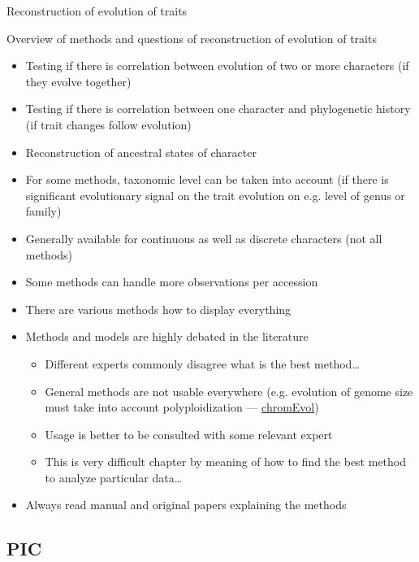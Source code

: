 \documentclass[compress, ucs, xelatex, 11pt, xcolor=svgnames, aspectratio=169,
	hyperref={
		bookmarks=true,
		unicode=true,
		colorlinks=true,
		pdftitle={Molecular data in R},
		plainpages=false,
		pdfauthor={Vojtech Zeisek},
		pdfsubject={Course about phylogeny and evolution in R},
		pdfcreator={XeLaTeX},
		pdfkeywords={R, evolution, phylogeny, molecular data},
		linkcolor=Crimson, %
		anchorcolor=Magenta, %
		citecolor=Magenta, %
		filecolor=Magenta, %
		menucolor=Magenta, %
		urlcolor=DodgerBlue, %
		pdftex},
	url={hyphens, lowtilde} %
	]{beamer}
\begin{document}
\begin{frame}{Reconstruction of evolution of traits}
	\tableofcontents[currentsection, sectionstyle=show/hide, hideothersubsections]
\end{frame}

\begin{frame}[allowframebreaks]{Overview of methods and questions of reconstruction of evolution of traits}
	\begin{itemize}
		\item Testing if there is correlation between evolution of two or more characters (if they evolve together)
		\item Testing if there is correlation between one character and phylogenetic history (if trait changes follow evolution)
		\item Reconstruction of ancestral states of character
		\item For some methods, taxonomic level can be taken into account (if there is significant evolutionary signal on the trait evolution on e.g. level of genus or family)
		\item Generally available for continuous as well as discrete characters (not all methods)
		\item Some methods can handle more observations per accession
		\item There are various methods how to display everything
		\item Methods and models are highly debated in the literature
		\begin{itemize}
			\item Different experts commonly disagree what is the best method\ldots
			\item General methods are not usable everywhere (e.g. evolution of genome size must take into account polyploidization --- \href{http://chromevol.tau.ac.il/}{chromEvol})
			\item Usage is better to be consulted with some relevant expert
			\item This is very difficult chapter by meaning of how to find the best method to analyze particular data\ldots
		\end{itemize}
		\item Always read manual and original papers explaining the methods
	\end{itemize}
\end{frame}

\subsection{PIC}
\end{document}
